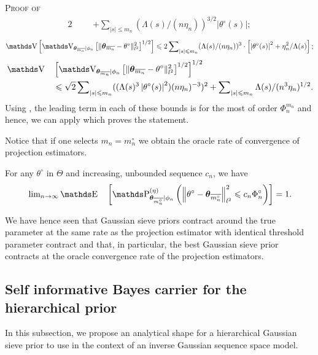\begin{pro}{\textsc{Proof of }\\}
\begin{alignat*}{2}
& && + \sum\nolimits_{\vert s \vert \leq m_{n}}(\Lambda(s)/(n \eta_{n}))^{3/2}\vert\theta^{\circ}(s)\vert;
\end{alignat*}
\[\V\left[\V_{\boldsymbol{\theta}_{\overline{m_{n}}} \vert \phi_{n}}\left[\Vert \boldsymbol{\theta}_{\overline{m_{n}}} - \theta^{\circ} \Vert_{l^{2}}^{2}\right]^{1/2}\right] \leq 2 \sum\nolimits_{\vert s \vert \leq m_{n}} (\Lambda(s)/(n \eta_{n}))^{3} \cdot \left[ \left\vert\theta^{\circ}(s)\right\vert^{2} + \eta_{n}^{2}/\Lambda(s)\right];\]
\begin{alignat*}{2}
&\V&&\left[\V_{\boldsymbol{\theta}_{\overline{m_{n}}} \vert \phi_{n}}\left[\Vert \boldsymbol{\theta}_{\overline{m_{n}}} - \theta^{\circ} \Vert_{l^{2}}^{2}\right]^{1/2}\right]^{1/2}\\
& && \leq \sqrt{2} \sum\nolimits_{\vert s \vert \leq m_{n}} ((\Lambda(s)^{3}\left\vert\theta^{\circ}(s)\right\vert^{2})(n \eta_{n})^{-3})^{2} + \sum\nolimits_{\vert s \vert \leq m_{n}} \Lambda(s)/(n^{3} \eta_{n})^{1/2}.
\end{alignat*}
Using , the leading term in each of these bounds is for the most of order $\Phi_{n}^{m_{n}}$ and hence, we can apply  which proves the statement.
\proEnd
\end{pro}

Notice that if one selects $m_{n} = m_{n}^{\circ}$ we obtain the oracle rate of convergence of projection estimators.

\begin{cor}\label{COR_BAYES_GAUSS_CONTRACT_ORACLESIEVE}
For any $\theta^{\circ}$ in $\Theta$ and increasing, unbounded sequence $c_{n}$, we have
\begin{alignat*}{3}
& && \lim\nolimits_{n \rightarrow \infty} \E&&\left[\P_{\boldsymbol{\theta}_{\overline{m_{n}^{\circ}}}\vert \phi_{n}}^{(\eta)}\left(\left\Vert \theta^{\circ} - \boldsymbol{\theta}_{\overline{m_{n}^{\circ}}}\right\Vert_{l^{2}}^{2} \leq c_{n} \Phi^{\circ}_{n} \right)\right] = 1.
\end{alignat*}
\reEnd
\end{cor}

We have hence seen that Gaussian sieve priors contract around the true parameter at the same rate as the projection estimator with identical threshold parameter contract and that, in particular, the best Gaussian sieve prior contracts at the oracle convergence rate of the projection estimators.

\subsection{Self informative Bayes carrier for the hierarchical prior}\label{BAYES_GAUSS_HIERARCHICAL}
In this subsection, we propose an analytical shape for a hierarchical Gaussian sieve prior to use in the context of an inverse Gaussian sequence space model.

